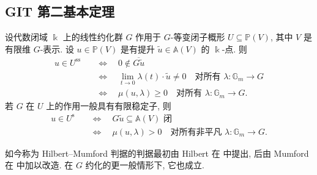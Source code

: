 \subsection{GIT 第二基本定理}\label{src:8.4.2-subsection}
\begin{theorem}\label{src:8.4.4}
设代数闭域 $\Bbbk$ 上的线性约化群 $G$ 作用于 $G$-等变闭子概形 $U\subseteq\mathbb P(V)$, 其中 $V$ 是有限维 $G$-表示. 设 $u\in\mathbb P(V)$ 是有提升 $\widetilde u\in\mathbb A(V)$ 的 $\Bbbk$-点. 则
\begin{align*}
u\in U^{\mathrm{ss}}&\quad\Longleftrightarrow\quad0\notin\overline{G\widetilde u}\\
&\quad\Longleftrightarrow\quad\lim_{t\to0}\lambda(t)\cdot\widetilde u\ne0\quad\text{对所有 }\lambda:\mathbb G_m\to G\\
&\quad\Longleftrightarrow\quad\mu(u,\lambda)\geq0\quad\text{对所有 }\lambda:\mathbb G_m\to G.
\end{align*}
若 $G$ 在 $U$ 上的作用一般具有有限稳定子, 则
\begin{align*}
u\in U^{\mathrm s}&\quad\Longleftrightarrow\quad G\widetilde u\subseteq\mathbb A(V)\text{ 闭}\\
&\quad\Longleftrightarrow\quad\mu(u,\lambda)>0\quad\text{对所有非平凡 }\lambda:\mathbb G_m\to G.
\end{align*}
\end{theorem}
\begin{remark}\label{src:8.4.5}
如今称为 Hilbert--Mumford 判据的判据最初由 Hilbert 在 \cite[\S15--16]{Hil93} 中提出, 后由 Mumford 在 \cite[第 53 页]{GIT} 中加以改造. 在 $G$ 约化的更一般情形下, 它也成立.
\end{remark}
